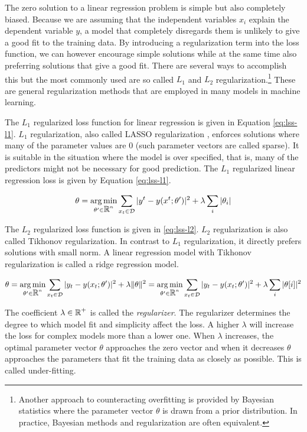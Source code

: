 The zero solution to a linear regression problem is simple but also
completely biased. Because we are assuming that the independent
variables $x_i$ explain the dependent variable $y$, a model that
completely disregards them is unlikely to give a good fit to the
training data. By introducing a regularization term into the loss
function, we can however encourage simple solutions while at the same
time also preferring solutions that give a good fit. There are several
ways to accomplish this but the most commonly used are so called $L_1$
and $L_2$ regularization.\footnote{Another approach to counteracting
  overfitting is provided by Bayesian statistics where the parameter
  vector $\theta$ is drawn from a prior distribution. In practice,
  Bayesian methods and regularization are often equivalent.} These are
general regularization methods that are employed in many models in
machine learning.

The $L_1$ regularized loss function for linear regression is given in
Equation \ref{eq:lss-l1}. $L_1$ regularization, also called LASSO
regularization \cite{Tibshirani1996}, enforces solutions where many of
the parameter values are $0$ (such parameter vectors are called
sparse). It is suitable in the situation where the model is over
specified, that is, many of the predictors might not be necessary for
good prediction. The $L_1$ regularized linear regression loss is given
by Equation \ref{eq:lss-l1}.

\begin{equation}
\theta = \operatorname*{arg\,min}_{\theta' \in \mbox{$\mathbb R$}^n} \sum_{x_t \in \mathcal{D}} | y^t - y(x^t\mbox{$ ; \, $} \theta')|^2 + \lambda \sum_i |\theta_i|\label{eq:lss-l1}
\end{equation}

The $L_2$ regularized loss function is given in \ref{eq:lss-l2}. $L_2$
regularization is also called Tikhonov regularization. In contrast to
$L_1$ regularization, it directly prefers solutions with small norm. A
linear regression model with Tikhonov regularization is called a ridge
regression model.

\begin{equation}
\theta = \operatorname*{arg\,min}_{\theta' \in \mbox{$\mathbb R$}^n} \sum_{x_t \in \mathcal{D}} | y_t - y(x_t\mbox{$ ; \, $} \theta')|^2 + \lambda \|\theta\|^2 = \operatorname*{arg\,min}_{\theta' \in \mbox{$\mathbb R$}^n} \sum_{x_t \in \mathcal{D}} | y_t - y(x_t\mbox{$ ; \, $} \theta')|^2 + \lambda \sum_i |\theta[i]|^2\label{eq:lss-l2}
\end{equation}

The coefficient $\lambda \in \mbox{$\mathbb R$}^+$ is called the {\it
  regularizer}. The regularizer determines the degree to which model
fit and simplicity affect the loss. A higher $\lambda$ will increase
the loss for complex models more than a lower one. When $\lambda$
increases, the optimal parameter vector $\theta$ approaches the zero
vector and when it decreases $\theta$ approaches the parameters that
fit the training data as closely as possible. This is called
under-fitting.


